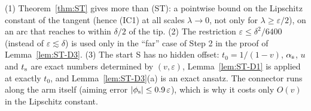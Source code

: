 \begin{remark}\label{rem:ST-more}
(1) Theorem~\ref{thm:ST} gives more than \textup{(ST)}: a pointwise bound on the Lipschitz constant of the tangent (hence (IC1) at all
scales $\lambda\to0$, not only for $\lambda\ge\varepsilon/2$), on an arc that reaches to within $\delta/2$ of the tip.
(2) The restriction $\varepsilon\le\delta^2/6400$ (instead of $\varepsilon\lesssim\delta$) is used only in the ``far'' case of Step 2
in the proof of Lemma~\ref{lem:ST-D3}.
(3) The start S has no hidden offset: $t_0=1/(1-v)$, $\alpha_{\mathrm s}$, $u$ and $t_{\mathrm s}$ are exact numbers determined by $(v,\varepsilon)$,
Lemma~\ref{lem:ST-D1} is applied at exactly $t_0$, and Lemma~\ref{lem:ST-D3}(a) is an exact ansatz. The connector runs along the arm
itself (aiming error $|\phi_{\mathrm s}|\le0.9\,\varepsilon$), which is why it costs only $O(v)$ in the Lipschitz constant.
\end{remark}

